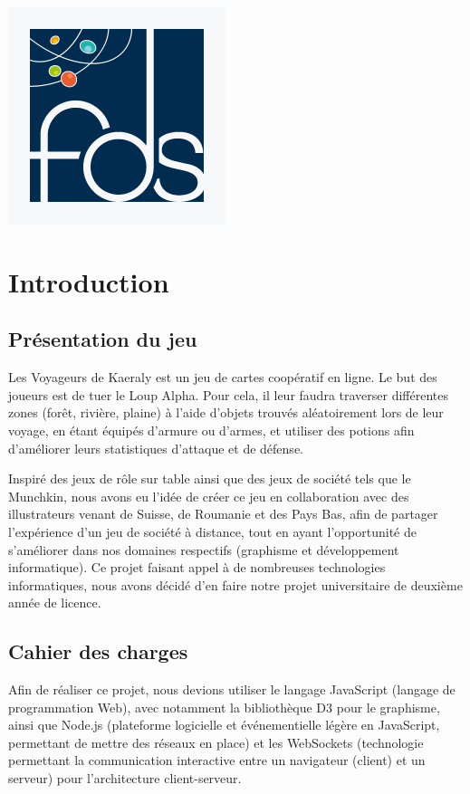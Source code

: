 \documentclass[12pt]{report}
\begin{document}
\begin{titlepage}
\begin{center}
			\vfill

			\includegraphics[scale=0.3]{images/logo-fds.jpg}~

		\end{center}

	\end{titlepage}

	\tableofcontents

	\chapter*{Introduction}

		\section*{Présentation du jeu}
  	Les Voyageurs de Kaeraly est un jeu de cartes coopératif en ligne. Le but des joueurs est de tuer le Loup Alpha. Pour cela, il leur faudra traverser différentes zones (forêt, rivière, plaine) à l'aide d'objets trouvés aléatoirement lors de leur voyage, en étant équipés d'armure ou d'armes, et utiliser des potions afin d'améliorer leurs statistiques d'attaque et de défense.

  	Inspiré des jeux de rôle sur table ainsi que des jeux de société tels que le Munchkin, nous avons eu l'idée de créer ce jeu en collaboration avec des illustrateurs venant de Suisse, de Roumanie et des Pays Bas, afin de partager l'expérience d'un jeu de société à distance, tout en ayant l'opportunité de s'améliorer dans nos domaines respectifs (graphisme et développement informatique). Ce projet faisant appel à de nombreuses technologies informatiques, nous avons décidé d'en faire notre projet universitaire de deuxième année de licence.

  	\section*{Cahier des charges}
  	Afin de réaliser ce projet, nous devions utiliser le langage JavaScript (langage de programmation Web), avec notamment la bibliothèque D3 pour le graphisme, ainsi que Node.js (plateforme logicielle et événementielle légère en JavaScript, permettant de mettre des réseaux en place) et les WebSockets (technologie permettant la communication interactive entre un navigateur (client) et un serveur) pour l'architecture client-serveur.
\end{document}
